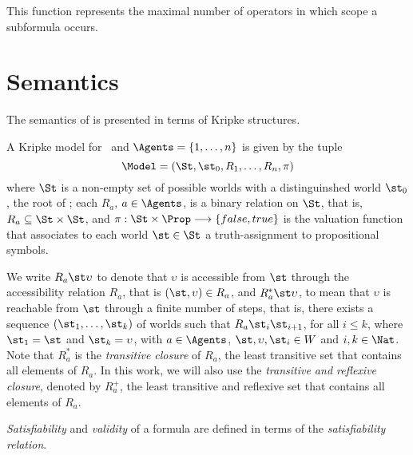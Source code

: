 This function represents the maximal number of operators in which scope a
subformula occurs.

\section{Semantics}%
\label{semantics}

The semantics of  is presented in terms of Kripke structures.

\begin{definition}%
\label{def:semantics}
    A Kripke model for \Prop~and $\Agents = \{1, \ldots, n\}$ is given by the tuple 
    \begin{equation}
        \Model = (\St, \st_0, R_1, \ldots, R_n, \pi)
    \end{equation}
    where $\St$ is a non-empty set of possible worlds with a distinguinshed world
    $\st_0$, the root of \Model; each $R_a$, $a \in \Agents$, is a binary relation
    on $\St$, that is, $R_a \subseteq \St \times \St$, and $\pi: \St \times \Prop
    \longrightarrow \{false, true\}$ is the valuation function that associates
    to each world $\st \in \St$ a truth-assignment to propositional symbols.
\end{definition}

We write $R_a \st \upsilon$ to denote that $\upsilon$ is accessible from $\st$
through the accessibility relation $R_a$, that is $(\st, \upsilon) \in R_a$, and
$R^*_a \st \upsilon$, to mean that $\upsilon$ is reachable from $\st$ through a
finite number of steps, that is, there exists a sequence $(\st_1, \ldots,
\st_k)$ of worlds such that $R_a \st_i \st_{i+1}$, for all $i \leq k$, where
$\st_1 = \st$ and $\st_k = \upsilon$, with $a \in \Agents$, $\st, \upsilon,
\st_i \in W$ and $i, k \in \Nat$. Note that $R_a^*$ is the \emph{transitive
closure} of $R_a$, the least transitive set that contains all elements of $R_a$.
In this work, we will also use the \emph{transitive and reflexive closure},
denoted by $R_a^+$, the least transitive and reflexive set that contains all
elements of $R_a$.

\emph{Satisfiability} and \emph{validity} of a formula are defined in terms of
the \emph{satisfiability relation}.

